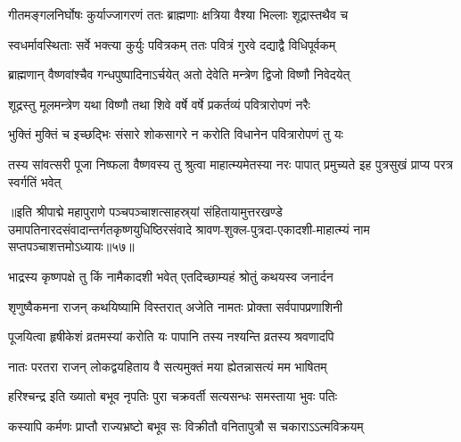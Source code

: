 \twolineshloka
{गीतमङ्गलनिर्घोषः कुर्याज्जागरणं ततः}
{ब्राह्मणाः क्षत्रिया वैश्या भिल्लाः शूद्रास्तथैव च}%

\twolineshloka
{स्वधर्मावस्थिताः सर्वे भक्त्या कुर्युः पवित्रकम्}
{ततः पवित्रं गुरवे दद्याद्वै विधिपूर्वकम्}%

\twolineshloka
{ब्राह्मणान् वैष्णवांश्चैव गन्धपुष्पादिनाऽर्चयेत्}
{अतो देवेति मन्त्रेण द्विजो विष्णौ निवेदयेत्}%

\twolineshloka
{शूद्रस्तु मूलमन्त्रेण यथा विष्णौ तथा शिवे}
{वर्षे वर्षे प्रकर्तव्यं पवित्रारोपणं नरैः}%

\twolineshloka
{भुक्तिं मुक्तिं च इच्छद्भिः संसारे शोकसागरे}
{न करोति विधानेन पवित्रारोपणं तु यः}%

\threelineshloka
{तस्य सांवत्सरी पूजा निष्फला वैष्णवस्य तु}
{श्रुत्वा माहात्म्यमेतस्या नरः पापात् प्रमुच्यते}
{इह पुत्रसुखं प्राप्य परत्र स्वर्गतिं भवेत्}%

॥इति श्रीपाद्मे महापुराणे पञ्चपञ्चाशत्साहस्र्यां संहितायामुत्तरखण्डे उमापतिनारदसंवादान्तर्गतकृष्णयुधिष्ठिरसंवादे श्रावण-शुक्ल-पुत्रदा-एकादशी-माहात्म्यं नाम सप्तपञ्चाशत्तमोऽध्यायः॥५७॥

\genMangalaShloka

\hyperref[sec:ekadashi_mahatmyam_padma_puranam]{\closesub}
\clearpage

\label{sec:padma-bhadrapada-krishnaja}

\ganapatyadiDhyanam
\padmaPuranam



\twolineshloka
{भाद्रस्य कृष्णपक्षे तु किं नामैकादशी भवेत्}
{एतदिच्छाम्यहं श्रोतुं कथयस्व जनार्दन}%


\twolineshloka
{शृणुष्वैकमना राजन् कथयिष्यामि विस्तरात्}
{अजेति नामतः प्रोक्ता सर्वपापप्रणाशिनी}%

\twolineshloka
{पूजयित्वा हृषीकेशं व्रतमस्यां करोति यः}
{पापानि तस्य नश्यन्ति व्रतस्य श्रवणादपि}%

\twolineshloka
{नातः परतरा राजन् लोकद्वयहिताय वै}
{सत्यमुक्तं मया ह्येतन्नासत्यं मम भाषितम्}%

\twolineshloka
{हरिश्चन्द्र इति ख्यातो बभूव नृपतिः पुरा}
{चक्रवर्ती सत्यसन्धः समस्ताया भुवः पतिः}%

\twolineshloka
{कस्यापि कर्मणः प्राप्तौ राज्यभ्रष्टो बभूव सः}
{विक्रीतौ वनितापुत्रौ स चकाराऽऽत्मविक्रयम्}%

